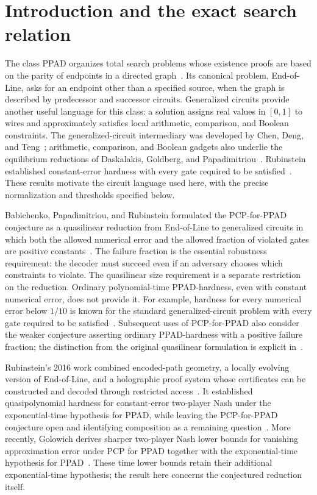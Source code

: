 \section{Introduction and the exact search relation}\label{sec:introduction}

The class PPAD organizes total search problems whose existence proofs are
based on the parity of endpoints in a directed graph~\cite{Papadimitriou1994}. Its canonical problem,
End-of-Line, asks for an endpoint other than a specified source, when the
graph is described by predecessor and successor circuits. Generalized
circuits provide another useful language for this class: a solution assigns
real values in $[0,1]$ to wires and approximately satisfies local arithmetic,
comparison, and Boolean constraints. The generalized-circuit intermediary
was developed by Chen, Deng, and Teng~\cite[Section~4.2]{CDT2007Preprint};
arithmetic, comparison, and Boolean gadgets also underlie the equilibrium
reductions of Daskalakis, Goldberg, and
Papadimitriou~\cite[Section~5.1]{DGP2009}. Rubinstein established
constant-error hardness with every gate required to be
satisfied~\cite[Theorem~2]{Rubinstein2018}. These results motivate the
circuit language used here, with the precise normalization and thresholds
specified below.

Babichenko, Papadimitriou, and Rubinstein formulated the PCP-for-PPAD
conjecture as a quasilinear reduction from End-of-Line to generalized
circuits in which both the allowed numerical error and the allowed fraction
of violated gates are positive constants~\cite[Conjecture~2]{BPR2016}.
The failure fraction is the essential robustness requirement: the decoder
must succeed even if an adversary chooses which constraints to violate.
The quasilinear size requirement is a separate restriction on the reduction.
Ordinary polynomial-time PPAD-hardness, even with constant numerical error,
does not provide it. For example, hardness for every numerical error below $1/10$ is known
for the standard generalized-circuit problem with every gate required to
be satisfied~\cite[Theorem~4.1]{DFHM2024}. Subsequent uses of PCP-for-PPAD also
consider the weaker conjecture asserting ordinary PPAD-hardness with a
positive failure fraction; the distinction from the original quasilinear
formulation is explicit in~\cite[Section~2.2.2]{Fisher2026}.

Rubinstein's 2016 work combined encoded-path geometry, a locally
evolving version of End-of-Line, and a holographic proof system whose
certificates can be constructed and decoded through restricted
access~\cite[Sections~3, 5, and~6]{Rubinstein2016Settling}. It established
quasipolynomial hardness for constant-error two-player Nash under the
exponential-time hypothesis for PPAD, while leaving the PCP-for-PPAD
conjecture open and identifying composition as a remaining
question~\cite[Theorem~1.2 and Section~1.3]{Rubinstein2016Settling}.
More recently, Golowich derives sharper two-player Nash lower bounds
for vanishing approximation error under PCP for PPAD together with
the exponential-time hypothesis for PPAD~\cite[Theorem~1.1]{Golowich2026}.
These time lower bounds retain their additional exponential-time
hypothesis; the result here concerns the conjectured reduction itself.

